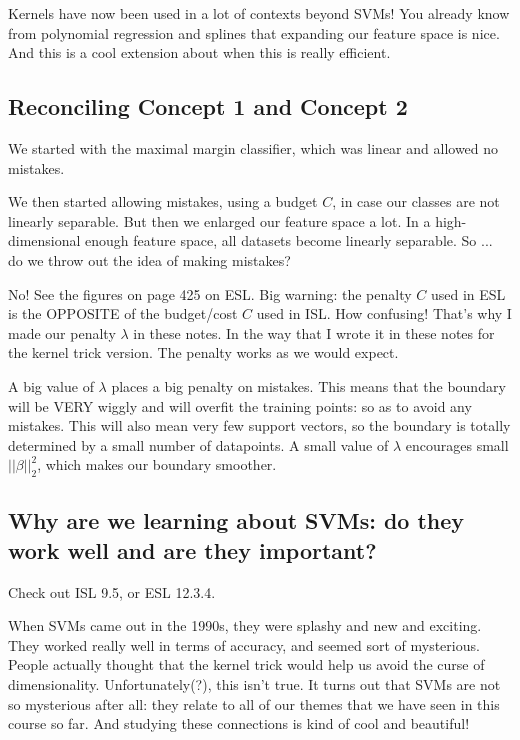 Kernels have now been used in a lot of contexts beyond SVMs! You already know from polynomial regression and splines that expanding our feature space is nice. And this is a cool extension about when this is really efficient. 

\subsection{Reconciling Concept 1 and Concept 2}

We started with the maximal margin classifier, which was linear and allowed no mistakes.

We then started allowing mistakes, using a budget $C$, in case our classes are not linearly separable. But then we enlarged our feature space a lot. In a high-dimensional enough feature space, all datasets become linearly separable. So ... do we throw out the idea of making mistakes?

No! See the figures on page 425 on ESL. Big warning: the penalty $C$ used in ESL is the OPPOSITE of the budget/cost $C$ used in ISL. How confusing! That's why I made our penalty $\lambda$ in these notes. In the way that I wrote it in these notes for the kernel trick version. The penalty works as we would expect. 

A big value of $\lambda$ places a big penalty on mistakes. This means that the boundary will be VERY wiggly and will overfit the training points: so as to avoid any mistakes. This will also mean very few support vectors, so the boundary is totally determined by a small number of datapoints. A small value of $\lambda$ encourages small $||\beta||_2^2$, which makes our boundary smoother. 

\subsection{Why are we learning about SVMs: do they work well and are they important?}

Check out ISL 9.5, or ESL 12.3.4. 

When SVMs came out in the 1990s, they were splashy and new and exciting. They worked really well in terms of accuracy, and seemed sort of mysterious. People actually thought that the kernel trick would help us avoid the curse of dimensionality. Unfortunately(?), this isn't true. It turns out that SVMs are not so mysterious after all: they relate to all of our themes that we have seen in this course so far. And studying these connections is kind of cool and beautiful! 

